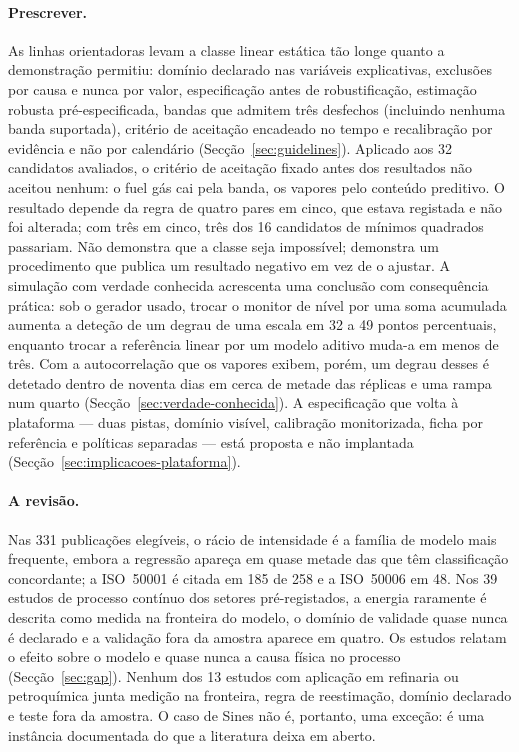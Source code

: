 \paragraph{Prescrever.} As linhas orientadoras levam a classe linear
estática tão longe quanto a demonstração permitiu: domínio declarado nas variáveis explicativas,
exclusões por causa e nunca por valor, especificação antes de robustificação,
estimação robusta pré-especificada, bandas que admitem três desfechos
(incluindo nenhuma banda suportada), critério de aceitação encadeado no
tempo e recalibração por evidência e não por calendário
(Secção~\ref{sec:guidelines}). Aplicado aos 32 candidatos avaliados, o
critério de aceitação fixado antes dos resultados não aceitou nenhum: o fuel
gás cai pela banda, os vapores pelo conteúdo preditivo. O resultado depende
da regra de quatro pares em cinco, que estava registada e não foi alterada;
com três em cinco, três dos 16 candidatos de mínimos quadrados passariam.
Não demonstra que a classe seja impossível; demonstra um procedimento que
publica um resultado negativo em vez de o ajustar. A simulação com verdade
conhecida acrescenta uma conclusão com consequência prática: sob o gerador
usado, trocar o monitor de nível por uma soma acumulada aumenta a deteção de
um degrau de uma escala em 32 a 49 pontos percentuais, enquanto trocar a
referência linear por um modelo aditivo muda-a em menos de três. Com a
autocorrelação que os vapores exibem, porém, um degrau desses é detetado
dentro de noventa dias em cerca de metade das réplicas e uma rampa num
quarto (Secção~\ref{sec:verdade-conhecida}). A especificação que volta à
plataforma --- duas pistas, domínio visível, calibração monitorizada, ficha
por referência e políticas separadas --- está proposta e não implantada
(Secção~\ref{sec:implicacoes-plataforma}).

\paragraph{A revisão.} Nas 331 publicações elegíveis, o rácio de
intensidade é a família de modelo mais frequente, embora a regressão apareça
em quase metade das que têm classificação concordante; a ISO~50001 é citada
em 185 de 258 e a ISO~50006 em 48. Nos 39 estudos de processo contínuo dos
setores pré-registados, a energia raramente é descrita como medida na
fronteira do modelo, o domínio de validade quase nunca é declarado e a
validação fora da amostra aparece em quatro. Os estudos relatam o efeito
sobre o modelo e quase nunca a causa física no processo
(Secção~\ref{sec:gap}). Nenhum dos 13 estudos com aplicação em refinaria ou
petroquímica junta medição na fronteira, regra de reestimação, domínio
declarado e teste fora da amostra. O caso de Sines não é, portanto, uma
exceção: é uma instância documentada do que a literatura deixa em aberto.

